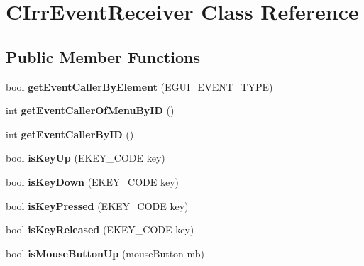 \hypertarget{class_c_irr_event_receiver}{
\section{CIrrEventReceiver Class Reference}
\label{class_c_irr_event_receiver}
}
\subsection*{Public Member Functions}
\begin{DoxyCompactItemize}
\item 
\hypertarget{class_c_irr_event_receiver_a80b5493b55da045d69441a8047aeeaf7}{
bool {\bfseries getEventCallerByElement} (EGUI\_\-EVENT\_\-TYPE)}
\label{class_c_irr_event_receiver_a80b5493b55da045d69441a8047aeeaf7}

\item 
\hypertarget{class_c_irr_event_receiver_a6c30dd39ef53a462fa7cc30a0ece91ba}{
int {\bfseries getEventCallerOfMenuByID} ()}
\label{class_c_irr_event_receiver_a6c30dd39ef53a462fa7cc30a0ece91ba}

\item 
\hypertarget{class_c_irr_event_receiver_acb8581aea1a9a1d0cd697788c5632144}{
int {\bfseries getEventCallerByID} ()}
\label{class_c_irr_event_receiver_acb8581aea1a9a1d0cd697788c5632144}

\item 
\hypertarget{class_c_irr_event_receiver_a630d32ecc61443906718cd0c22797374}{
bool {\bfseries isKeyUp} (EKEY\_\-CODE key)}
\label{class_c_irr_event_receiver_a630d32ecc61443906718cd0c22797374}

\item 
\hypertarget{class_c_irr_event_receiver_a63786a575da50da7141f7cfb96b21c62}{
bool {\bfseries isKeyDown} (EKEY\_\-CODE key)}
\label{class_c_irr_event_receiver_a63786a575da50da7141f7cfb96b21c62}

\item 
\hypertarget{class_c_irr_event_receiver_a7738ab98bfbff85fc805ef77716785b9}{
bool {\bfseries isKeyPressed} (EKEY\_\-CODE key)}
\label{class_c_irr_event_receiver_a7738ab98bfbff85fc805ef77716785b9}

\item 
\hypertarget{class_c_irr_event_receiver_a0dc9b5eb19e7a684c671a80cee172632}{
bool {\bfseries isKeyReleased} (EKEY\_\-CODE key)}
\label{class_c_irr_event_receiver_a0dc9b5eb19e7a684c671a80cee172632}

\item 
\hypertarget{class_c_irr_event_receiver_abd98d1015805e38f8f18f46761981997}{
bool {\bfseries isMouseButtonUp} (mouseButton mb)}
\label{class_c_irr_event_receiver_abd98d1015805e38f8f18f46761981997}


\end{DoxyCompactItemize}
